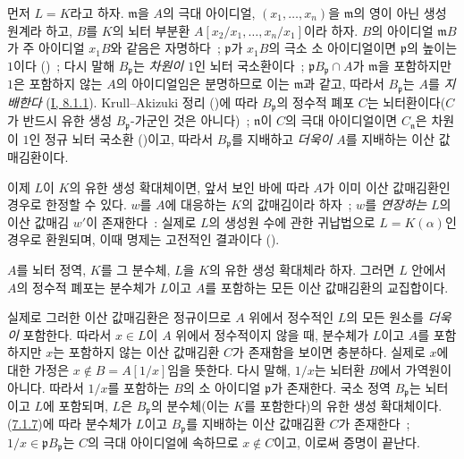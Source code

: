 먼저 $L=K$라고 하자. $\mathfrak{m}$을 $A$의 극대 아이디얼,
$(x_1,\ldots,x_n)$을 $\mathfrak{m}$의 영이 아닌 생성원계라 하고,
$B$를 $K$의 뇌터 부분환
$A[x_2/x_1,\ldots,x_n/x_1]$이라 하자. $B$의 아이디얼
$\mathfrak{m}B$가 주 아이디얼 $x_1B$와 같음은 자명하다~;
$\mathfrak{p}$가 $x_1B$의 극소 소 아이디얼이면 $\mathfrak{p}$의 높이는
$1$이다 (\cite[t.~I, p.~277]{I-13})~; 다시 말해
$B_{\mathfrak{p}}$는 \emph{차원이 $1$}인 뇌터 국소환이다~;
$\mathfrak{p}B_{\mathfrak{p}}\cap A$가 $\mathfrak{m}$을 포함하지만
$1$은 포함하지 않는 $A$의 아이디얼임은 분명하므로 이는
$\mathfrak{m}$과 같고, 따라서 $B_{\mathfrak{p}}$는 $A$를
\emph{지배한다} (\hyperref[I.8.1.1-ko]{I, 8.1.1}). Krull--Akizuki 정리
(\cite[p.~293]{II-25})에 따라 $B_{\mathfrak{p}}$의 정수적 폐포 $C$는
뇌터환이다($C$가 반드시 유한 생성 $B_{\mathfrak{p}}$-가군인 것은
아니다)~; $\mathfrak{n}$이 $C$의 극대 아이디얼이면
$C_{\mathfrak{n}}$은 차원이 $1$인 정규 뇌터 국소환
(\cite[p.~295]{II-25})이고, 따라서 $B_{\mathfrak{p}}$를 지배하고
\emph{더욱이} $A$를 지배하는 이산 값매김환이다.

이제 $L$이 $K$의 유한 생성 확대체이면, 앞서 보인 바에 따라 $A$가
이미 이산 값매김환인 경우로 한정할 수 있다. $w$를 $A$에 대응하는
$K$의 값매김이라 하자~; $w$를 \emph{연장하는} $L$의 이산 값매김
$w'$이 존재한다~: 실제로 $L$의 생성원 수에 관한 귀납법으로
$L=K(\alpha)$인 경우로 환원되며, 이때 명제는 고전적인 결과이다
(\cite[p.~106]{II-24}).

\begin{corollary}[7.1.8]
\label{II.7.1.8-ko}
$A$를 뇌터 정역, $K$를 그 분수체, $L$을 $K$의 유한 생성 확대체라
하자. 그러면 $L$ 안에서 $A$의 정수적 폐포는 분수체가 $L$이고
$A$를 포함하는 모든 이산 값매김환의 교집합이다.
\end{corollary}

실제로 그러한 이산 값매김환은 정규이므로 $A$ 위에서 정수적인
$L$의 모든 원소를 \emph{더욱이} 포함한다. 따라서 $x\in L$이 $A$
위에서 정수적이지 않을 때, 분수체가 $L$이고 $A$를 포함하지만 $x$는
포함하지 않는 이산 값매김환 $C$가 존재함을 보이면 충분하다. 실제로
$x$에 대한 가정은 $x\notin B=A[1/x]$임을 뜻한다. 다시 말해,
$1/x$는 뇌터환 $B$에서 가역원이 아니다. 따라서 $1/x$를 포함하는
$B$의 소 아이디얼 $\mathfrak{p}$가 존재한다. 국소 정역
$B_{\mathfrak{p}}$는 뇌터이고 $L$에 포함되며, $L$은
$B_{\mathfrak{p}}$의 분수체(이는 $K$를 포함한다)의 유한 생성
확대체이다. (\hyperref[II.7.1.7-ko]{7.1.7})에 따라 분수체가 $L$이고
$B_{\mathfrak{p}}$를 지배하는 이산 값매김환 $C$가 존재한다~;
$1/x\in\mathfrak{p}B_{\mathfrak{p}}$는 $C$의 극대 아이디얼에
속하므로 $x\notin C$이고, 이로써 증명이 끝난다.

